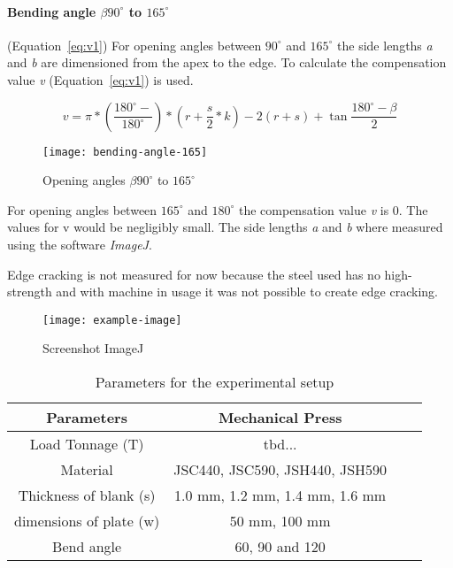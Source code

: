 \paragraph{Bending angle $\beta90^\circ$ to $165^\circ$} (Equation~\ref{eq:v1})
For opening angles between $90^\circ$ and $165^\circ$ the side lengths \textit{a} and \textit{b} are dimensioned from the apex to the edge. 
To calculate the compensation value \textit{v} (Equation~\ref{eq:v1}) is used. 
\cite{din6935}

\begin{equation}\label{eq:v2}
    v=\pi*(\frac{180^\circ-}{180^\circ})*(r+\frac{s}{2}*k)-2(r+s)+\tan{\frac{180^\circ-\beta}{2}}
\end{equation}

\begin{figure}[!h]
	\centering
	\texttt{[image: bending-angle-165]}
	\caption[Opening angles $\beta90^\circ$ to $165^\circ$]{Opening angles $\beta90^\circ$ to $165^\circ$ \cite{din6935}}
	\label{fig:v2-image}
\end{figure}

For opening angles between $165^\circ$ and $180^\circ$ the compensation value \textit{v} is 0. The values for v would be negligibly small. \cite{din6935} The side lengths \textit{a} and \textit{b} where measured using the software \textit{ImageJ}. 

Edge cracking is not measured for now because the steel used has no high-strength and with machine in usage it was not possible to create edge cracking.

\begin{figure}[!h]
	\centering
	\texttt{[image: example-image]}
	\caption[Screenshot ImageJ]{Screenshot ImageJ}
	\label{fig:imagej-screenshot}
\end{figure}



\begin{table}[ht!]
\centering
    \begin{tabular}{ |c|c|c|c| } 
        \hline
        Parameters & Mechanical Press \\
        \hline
        Load Tonnage (T) & tbd... \\
        Material & JSC440, JSC590, JSH440, JSH590 \\
        Thickness of blank (s) & 1.0 mm, 1.2 mm, 1.4 mm, 1.6 mm \\ 
        dimensions of plate (w) & 50 mm, 100 mm \\ 
        Bend angle & 60, 90 and 120 \\
        \hline
    \end{tabular}
    \caption{Parameters for the experimental setup}
\end{table}

